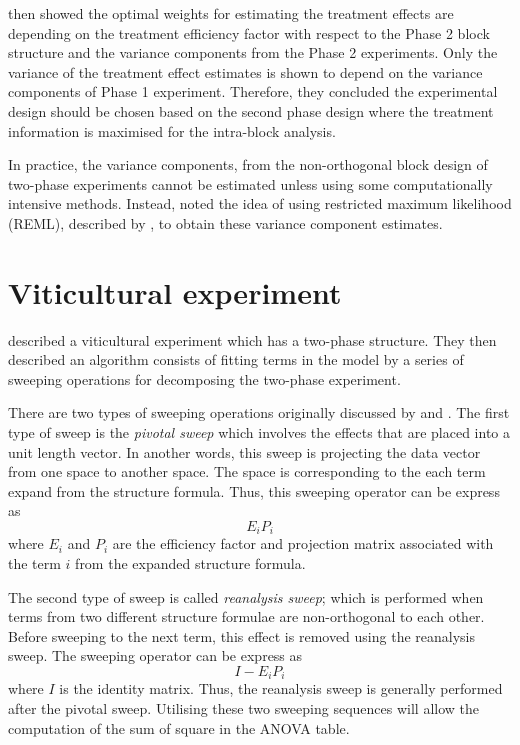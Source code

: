 \documentclass[11pt,a4paper]{article}
\begin{document}
\cite{Wood1988} then showed the optimal weights for estimating the treatment effects are depending on the treatment efficiency factor with respect to the Phase 2 block structure and the variance components from the Phase 2 experiments. Only the variance of the treatment effect estimates is shown to depend on the variance components of Phase 1 experiment. Therefore, they concluded the experimental design should be chosen based on the second phase design where the treatment information is maximised for the intra-block analysis.

In practice, the variance components, from the non-orthogonal block design of two-phase experiments cannot be estimated unless using some computationally intensive methods. Instead, \cite{Wood1988} noted the idea of using restricted maximum likelihood (REML), described by \cite{Patterson1971}, to obtain these variance component estimates. 

 


\section{Viticultural experiment}
\cite{Brien1999} described a viticultural experiment which has a two-phase structure. They then described an algorithm consists of fitting terms in the model by a series of sweeping operations for decomposing the two-phase experiment. 

There are two types of sweeping operations originally discussed by \cite{Wilkinson1970} and \cite{Payne1977}. The first type of sweep is the \emph{pivotal sweep} which involves the effects that are placed into a unit length vector. In another words, this sweep is projecting the data vector from one space to another space. The space is corresponding to the each term expand from the structure formula. Thus, this sweeping operator can be express as 
\begin{equation}
E_i P_i
\end{equation}
where $E_i$ and $P_i$ are the efficiency factor and projection matrix associated with the term $i$ from the expanded structure formula. 

The second type of sweep is called \emph{reanalysis sweep}; which is performed when terms from two different structure formulae are non-orthogonal to each other. Before sweeping to the next term, this effect is removed using the reanalysis sweep. The sweeping operator can be express as 
\begin{equation}
I - E_i P_i
\end{equation}
where $I$ is the identity matrix. Thus, the reanalysis sweep is generally performed after the pivotal sweep. Utilising these two sweeping sequences will allow the computation of the sum of square in the ANOVA table. 
\end{document}
